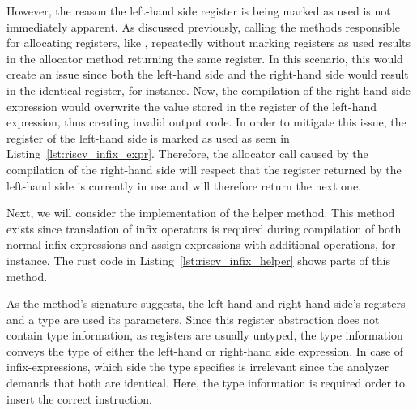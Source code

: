 However, the reason the left-hand side register is being marked as used is not immediately apparent.
As discussed previously, calling the methods responsible for allocating registers, like ,
repeatedly without marking registers as used results in the allocator method returning the same register.
In this scenario, this would create an issue since both the left-hand side and the right-hand side would result in the identical register,  for instance.
Now, the compilation of the right-hand side expression would overwrite the value stored in the register of the left-hand expression, thus creating invalid output code.
In order to mitigate this issue, the register of the left-hand side is marked as used as seen in Listing~\ref{lst:riscv_infix_expr}.
Therefore, the allocator call caused by the compilation of the right-hand side will respect that the register returned by the left-hand side is currently in use and will therefore return the next one.

Next, we will consider the implementation of the  helper method.
This method exists since translation of infix operators is required during compilation of both normal infix-expressions and assign-expressions with additional operations,  for instance.
The rust code in Listing~\ref{lst:riscv_infix_helper} shows parts of this method.


As the method's signature suggests, the left-hand and right-hand side's registers and a type are used its parameters.
Since this register abstraction does not contain type information, as registers are usually untyped, the type information conveys the type of either the left-hand or right-hand side expression.
In case of infix-expressions, which side the type specifies is irrelevant since the analyzer demands that both are identical.
Here, the type information is required order to insert the correct instruction.

